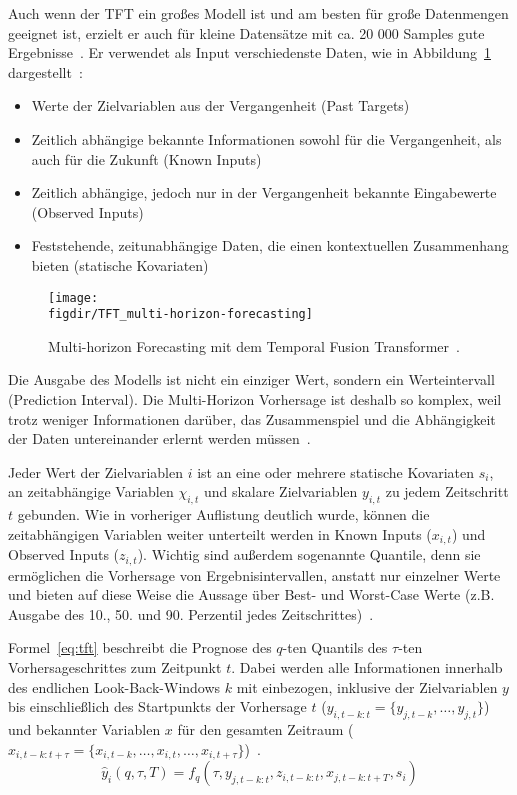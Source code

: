 Auch wenn der \ac{TFT} ein großes Modell ist und am besten für große Datenmengen geeignet ist, erzielt er auch für kleine Datensätze mit ca. 20 000 Samples gute Ergebnisse~\cite{Beitner.2020}.
Er verwendet als Input verschiedenste Daten, wie in Abbildung~\ref{FIG:tft-forecasting} dargestellt~\cite{Lim.19.12.2019}:
\begin{itemize}
 \item Werte der Zielvariablen aus der Vergangenheit (Past Targets)
 \item Zeitlich abhängige bekannte Informationen sowohl für die Vergangenheit, als auch für die Zukunft (Known Inputs)
 \item Zeitlich abhängige, jedoch nur in der Vergangenheit bekannte Eingabewerte (Observed Inputs)
 \item Feststehende, zeitunabhängige Daten, die einen kontextuellen Zusammenhang bieten (statische Kovariaten)
\end{itemize}
\begin{figure}
 \caption[Multi-horizon Forecasting mit dem Temporal Fusion Transformer]{Multi-horizon Forecasting mit dem Temporal Fusion Transformer~\cite{Lim.19.12.2019}.}
 {\texttt{[image: \\figdir/TFT\_multi-horizon-forecasting]}}
 \label{FIG:tft-forecasting}
\end{figure}
Die Ausgabe des Modells ist nicht ein einziger Wert, sondern ein Werteintervall (Prediction Interval).
Die Multi-Horizon Vorhersage ist deshalb so komplex, weil trotz weniger Informationen darüber, das Zusammenspiel und die Abhängigkeit der Daten untereinander erlernt werden müssen~\cite{Lim.19.12.2019}.

Jeder Wert der Zielvariablen $i$ ist an eine oder mehrere statische Kovariaten $s_i$, an zeitabhängige Variablen $\chi_{i,t}$ und skalare Zielvariablen $y_{i,t}$ zu jedem Zeitschritt $t$ gebunden.
Wie in vorheriger Auflistung deutlich wurde, können die zeitabhängigen Variablen weiter unterteilt werden in Known Inputs ($x_{i,t}$) und Observed Inputs ($z_{i,t}$).
Wichtig sind außerdem sogenannte Quantile, denn sie ermöglichen die Vorhersage von Ergebnisintervallen, anstatt nur einzelner Werte und bieten auf diese Weise die Aussage über Best- und Worst-Case Werte (z.B. Ausgabe des 10., 50. und 90. Perzentil jedes Zeitschrittes)~\cite{Lim.19.12.2019}.

Formel~\ref{eq:tft} beschreibt die Prognose des $q$-ten Quantils des $\tau$-ten Vorhersageschrittes zum Zeitpunkt $t$.
Dabei werden alle Informationen innerhalb des endlichen Look-Back-Windows $k$ mit einbezogen, inklusive der Zielvariablen $y$ bis einschließlich des Startpunkts der Vorhersage $t$ ($y_{i,t-k:t} = \{y_{j,t-k}, \ldots, y_{j,t}\}$) und bekannter Variablen $x$ für den gesamten Zeitraum \newline ($x_{i,t-k:t+\tau} = \{x_{i,t-k}, \ldots, x_{i,t}, \ldots, x_{i,t+\tau}\}$)~\cite{Lim.19.12.2019}.
\begin{equation}
 \label{eq:tft}
 \hat{y}_i(q, \tau, T) = f_q(\tau, y_{j,t-k:t}, z_{i,t-k:t}, x_{j,t-k:t+T}, s_i)
\end{equation}

